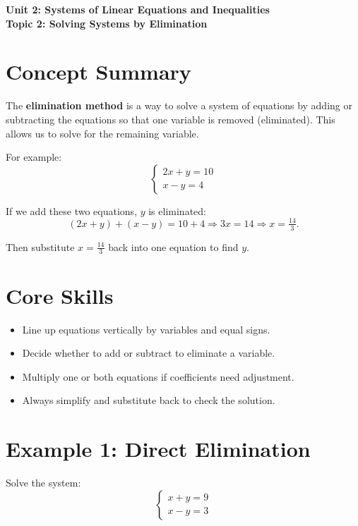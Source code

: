 \documentclass[12pt]{article}
\begin{document}
\begin{center}
    \LARGE \textbf{Unit 2: Systems of Linear Equations and Inequalities} \\[6pt]
    \Large \textbf{Topic 2: Solving Systems by Elimination}
\end{center}

\vspace{1em}

\section*{Concept Summary}

The \textbf{elimination method} is a way to solve a system of equations by adding or subtracting the equations so that one variable is removed (eliminated). This allows us to solve for the remaining variable.

For example:
\[
\begin{cases}
2x + y = 10 \\
x - y = 4
\end{cases}
\]

If we add these two equations, \(y\) is eliminated:
\[
(2x + y) + (x - y) = 10 + 4 \Rightarrow 3x = 14 \Rightarrow x = \tfrac{14}{3}.
\]

Then substitute \(x = \tfrac{14}{3}\) back into one equation to find \(y\).

\section*{Core Skills}
\begin{itemize}
    \item Line up equations vertically by variables and equal signs.
    \item Decide whether to add or subtract to eliminate a variable.
    \item Multiply one or both equations if coefficients need adjustment.
    \item Always simplify and substitute back to check the solution.
\end{itemize}

\section*{Example 1: Direct Elimination}

Solve the system:
\[
\begin{cases}
x + y = 9 \\
x - y = 3
\end{cases}
\]
\end{document}
